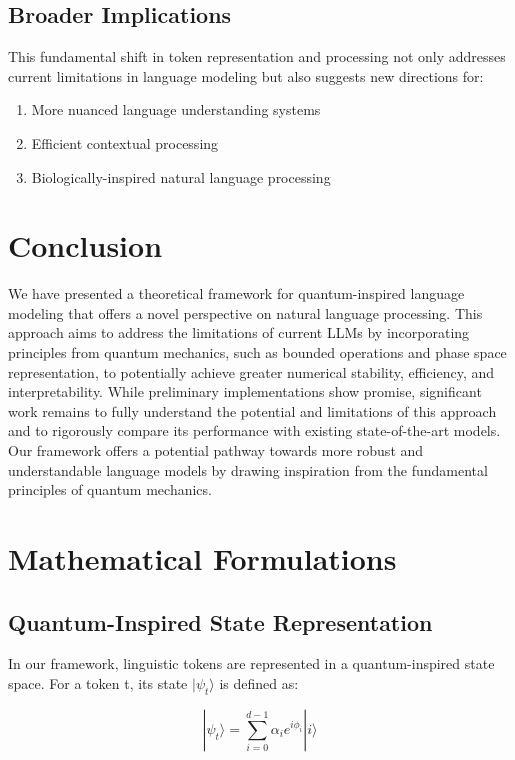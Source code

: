 \documentclass[twocolumn]{article}
\begin{document}
\subsection{Broader Implications}
This fundamental shift in token representation and processing not only addresses current limitations in language modeling but also suggests new directions for:
\begin{enumerate}
    \item More nuanced language understanding systems
    \item Efficient contextual processing
    \item Biologically-inspired natural language processing
\end{enumerate}

\section{Conclusion}
We have presented a theoretical framework for quantum-inspired language modeling that offers a novel perspective on natural language processing. This approach aims to address the limitations of current LLMs by incorporating principles from quantum mechanics, such as bounded operations and phase space representation, to potentially achieve greater numerical stability, efficiency, and interpretability. While preliminary implementations show promise, significant work remains to fully understand the potential and limitations of this approach and to rigorously compare its performance with existing state-of-the-art models. Our framework offers a potential pathway towards more robust and understandable language models by drawing inspiration from the fundamental principles of quantum mechanics.

\appendix
\section{Mathematical Formulations}

\subsection{Quantum-Inspired State Representation}
In our framework, linguistic tokens are represented in a quantum-inspired state space. For a token t, its state $|\psi_t\rangle$ is defined as:

\begin{equation}
|\psi_t\rangle = \sum_{i=0}^{d-1} \alpha_i e^{i\phi_i} |i\rangle
\end{equation}
\end{document}
